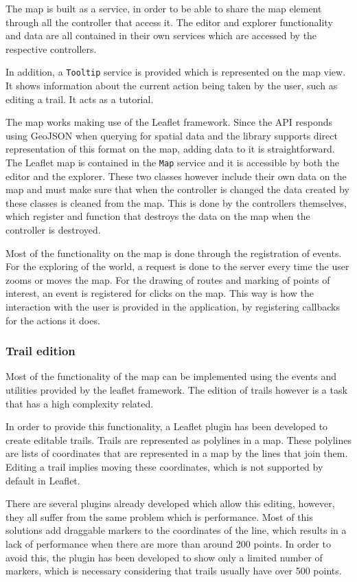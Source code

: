 The map is built as a service, in order to be able to share the map element through all the controller that access it. The editor and explorer functionality and data are all contained in their own services which are accessed by the respective controllers.

In addition, a \texttt{Tooltip} service is provided which is represented on the map view. It shows information about the current action being taken by the user, such as editing a trail. It acts as a tutorial.

The map works making use of the Leaflet framework. Since the API responds using GeoJSON when querying for spatial data and the library supports direct representation of this format on the map, adding data to it is straightforward. The Leaflet map is contained in the \texttt{Map} service and it is accessible by both the editor and the explorer. These two classes however include their own data on the map and must make sure that when the controller is changed the data created by these classes is cleaned from the map. This is done by the controllers themselves, which register and function that destroys the data on the map when the controller is destroyed.

Most of the functionality on the map is done through the registration of events. For the exploring of the world, a request is done to the server every time the user zooms or moves the map. For the drawing of routes and marking of points of interest, an event is registered for clicks on the map. This way is how the interaction with the user is provided in the application, by registering callbacks for the actions it does.

\subsubsection*{Trail edition}

Most of the functionality of the map can be implemented using the events and utilities provided by the leaflet framework. The edition of trails however is a task that has a high complexity related.

In order to provide this functionality, a Leaflet plugin has been developed to create editable trails. Trails are represented as polylines in a map. These polylines are lists of coordinates that are represented in a map by the lines that join them. Editing a trail implies moving these coordinates, which is not supported by default in Leaflet.

There are several plugins already developed which allow this editing, however, they all suffer from the same problem which is performance. Most of this solutions add draggable markers to the coordinates of the line, which results in a lack of performance when there are more than around 200 points. In order to avoid this, the plugin has been developed to show only a limited number of markers, which is necessary considering that trails usually have over 500 points.

